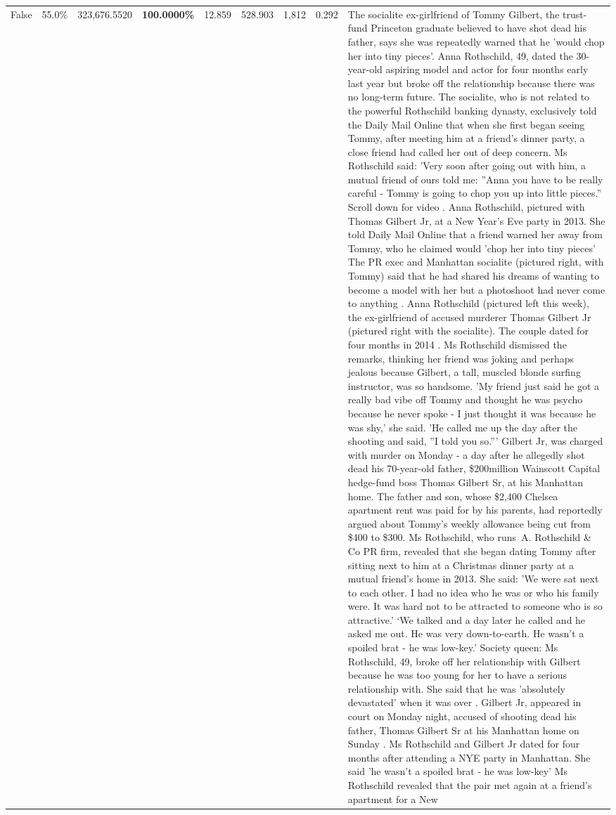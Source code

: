\begin{table}[H]
\begin{tabular}{lllrlllll}
False & 55.0\% & 323,676.5520 & \bfseries \color{red} 100.0000\% & 12.859 & 528.903 & 1,812 & 0.292 & The socialite ex-girlfriend of Tommy Gilbert, the trust-fund Princeton graduate believed to have shot dead his father, says she was repeatedly warned that he 'would chop her into tiny pieces'. Anna Rothschild, 49, dated the 30-year-old aspiring model and actor for four months early last year but broke off the relationship because there was no long-term future. The socialite, who is not related to the powerful Rothschild banking dynasty, exclusively told the Daily Mail Online that when she first began seeing Tommy, after meeting him at a friend's dinner party, a close friend had called her out of deep concern. Ms Rothschild said: 'Very soon after going out with him, a mutual friend of ours told me: ''Anna you have to be really careful - Tommy is going to chop you up into little pieces.'' Scroll down for video . Anna Rothschild, pictured with Thomas Gilbert Jr, at a New Year's Eve party in 2013. She told Daily Mail Online that a friend warned her away from Tommy, who he claimed would 'chop her into tiny pieces' The PR exec and Manhattan socialite (pictured right, with Tommy) said that he had shared his dreams of wanting to become a model with her but a photoshoot had never come to anything . Anna Rothschild (pictured left this week), the ex-girlfriend of accused murderer Thomas Gilbert Jr (pictured right with the socialite). The couple dated for four months in 2014 . Ms Rothschild dismissed the remarks, thinking her friend was joking and perhaps jealous because Gilbert, a tall, muscled blonde surfing instructor, was so handsome. 'My friend just said he got a really bad vibe off Tommy and thought he was psycho because he never spoke - I just thought it was because he was shy,' she said. 'He called me up the day after the shooting and said, ''I told you so.''' Gilbert Jr, was charged with murder on Monday - a day after he allegedly shot dead his 70-year-old father, \$200million Wainscott Capital hedge-fund boss Thomas Gilbert Sr, at his Manhattan home. The father and son, whose \$2,400 Chelsea apartment rent was paid for by his parents, had reportedly argued about Tommy's weekly allowance being cut from \$400 to \$300. Ms Rothschild, who runs A. Rothschild \& Co PR firm, revealed that she began dating Tommy after sitting next to him at a Christmas dinner party at a mutual friend's home in 2013. She said: 'We were sat next to each other. I had no idea who he was or who his family were. It was hard not to be attracted to someone who is so attractive.' ‘We talked and a day later he called and he asked me out. He was very down-to-earth. He wasn’t a spoiled brat - he was low-key.’ Society queen: Ms Rothschild, 49, broke off her relationship with Gilbert because he was too young for her to have a serious relationship with. She said that he was 'absolutely devastated' when it was over . Gilbert Jr, appeared in court on Monday night, accused of shooting dead his father, Thomas Gilbert Sr at his Manhattan home on Sunday . Ms Rothschild and Gilbert Jr dated for four months after attending a NYE party in Manhattan. She said 'he wasn't a spoiled brat - he was low-key' Ms Rothschild revealed that the pair met again at a friend’s apartment for a New 
\end{tabular}
\end{table}
